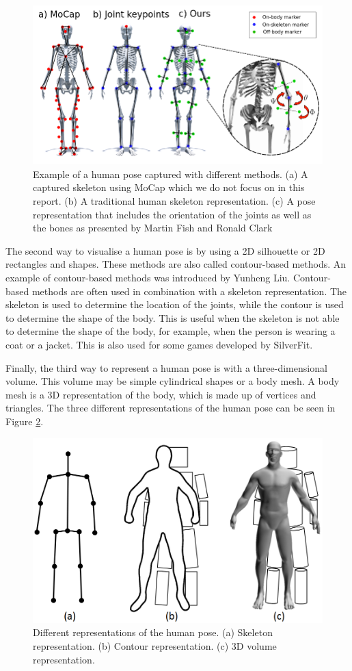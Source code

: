 \begin{figure}
    \centering
    \includegraphics[width=0.8\linewidth]{figures/HPE/PoseExample.png}
    \caption{Example of a human pose captured with different methods. (a) A captured skeleton using MoCap which we do not focus on in this report. (b) A traditional human skeleton representation. (c) A pose representation that includes the orientation of the joints as well as the bones as presented by Martin Fish and Ronald Clark\cite{KeypointOrientation}}
    \label{fig:pose_example}
\end{figure}

The second way to visualise a human pose is by using a 2D silhouette or 2D rectangles and shapes. These methods are also called contour-based methods. An example of contour-based methods was introduced by Yunheng Liu\cite{contourHPE}. Contour-based methods are often used in combination with a skeleton representation. The skeleton is used to determine the location of the joints, while the contour is used to determine the shape of the body. This is useful when the skeleton is not able to determine the shape of the body, for example, when the person is wearing a coat or a jacket. This is also used for some games developed by SilverFit.

Finally, the third way to represent a human pose is with a three-dimensional volume. This volume may be simple cylindrical shapes or a body mesh. A body mesh is a 3D representation of the body, which is made up of vertices and triangles. The three different representations of the human pose can be seen in Figure \ref{fig:pose_representation}.

\begin{figure}
    \centering
    \includegraphics[width=0.8\linewidth]{figures/HPE/PoseRepresentation.png}
    \caption{Different representations of the human pose. (a) Skeleton representation. (b) Contour representation. (c) 3D volume representation. \cite{HPESurveyOriginal}}
    \label{fig:pose_representation}
\end{figure}

